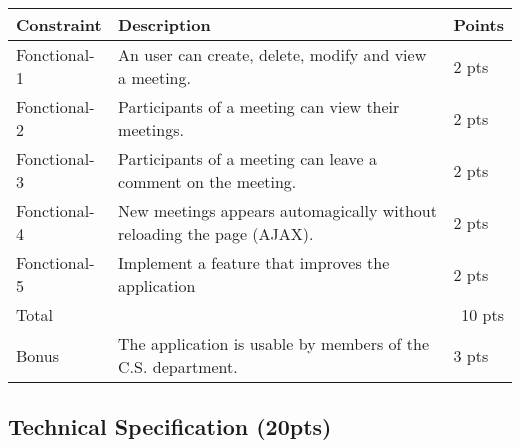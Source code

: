 \documentclass{article}         %
\newcounter{notetab}
\newcommand{\zero}{\setcounter{notetab}{0}}
\begin{document}
\zero
\begin{tabular}{|p{2cm}|p{10cm}|p{1cm}|}
  \hline
  Constraint & Description & Points \\

  \hline
  Fonctional-1 & An user can create, delete, modify and view a meeting. & 2 pts \\
  Fonctional-2 & Participants of a meeting can view their meetings. & 2 pts \\
  Fonctional-3 & Participants of a meeting can leave a comment on the meeting. & 2 pts \\
  Fonctional-4 & New meetings appears automagically without reloading the page (AJAX). & 2 pts \\
  Fonctional-5 & Implement a feature that improves the application & 2 pts \\
  \hline
  Total & \multicolumn{2}{r|}{   10 pts \hspace{1 mm}} \\
  \hline
  Bonus & The application is usable by members of the C.S. department. & 3 pts \\

  \hline
\end{tabular}


\subsection{Technical Specification (20pts)}
\end{document}
